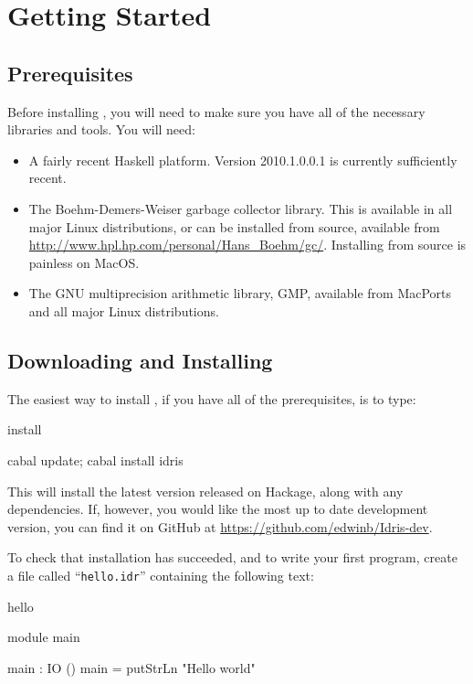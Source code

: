 \section{Getting Started}

\subsection{Prerequisites} 

Before installing \Idris{}, you will need to make sure you have all of the necessary
libraries and tools. You will need:

\begin{itemize}
\item A fairly recent Haskell platform. Version 2010.1.0.0.1 is currently
sufficiently recent.
\item The Boehm-Demers-Weiser garbage collector library. This is available in
all major Linux distributions, or can be installed from source, available
from \url{http://www.hpl.hp.com/personal/Hans_Boehm/gc/}. Installing from
source is painless on MacOS.
\item The GNU multiprecision arithmetic library, GMP, available from MacPorts and
all major Linux distributions.
\end{itemize}

\subsection{Downloading and Installing}

The easiest way to install \Idris{}, if you have all of the prerequisites, is to type:

\begin{SaveVerbatim}{install}

cabal update; cabal install idris

\end{SaveVerbatim}

\noindent
This will install the latest version released on Hackage, along with any dependencies. 
If, however, you would like the most up
to date development version, you can find it on GitHub at
\url{https://github.com/edwinb/Idris-dev}.

To check that installation has succeeded, and to write your first \Idris{}
program, create a file called ``\texttt{hello.idr}'' containing the following
text:

\begin{SaveVerbatim}{hello}

module main

main : IO ()
main = putStrLn "Hello world"

\end{SaveVerbatim}

